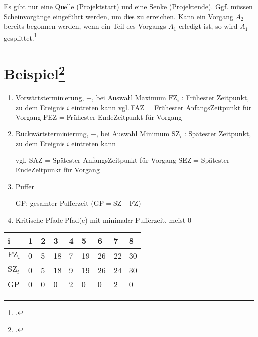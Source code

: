 \documentclass{lehramt-informatik}
\begin{document}
Es gibt nur eine Quelle (Projektstart) und eine Senke (Projektende).
Ggf. müssen Scheinvorgänge eingeführt werden, um dies zu erreichen.
%
Kann ein Vorgang $A_2$ bereits begonnen werden, wenn ein Teil des
Vorgangs $A_1$ erledigt ist, so wird $A_1$ gesplittet.\footcite[Seite
27]{sosy:fs:3}

\section{Beispiel\footcite[Seite 16 - 21]{sosy:fs:3}}

\begin{center}
\end{center}

\begin{enumerate}

%

\item  Vorwärtsterminierung, $+$, bei Auswahl Maximum
$\text{FZ}_i$ : Frühester Zeitpunkt, zu dem Ereignis $i$ eintreten kann
vgl. FAZ = Frühester AnfangsZeitpunkt für Vorgang
FEZ = Frühester EndeZeitpunkt für Vorgang

%

\item Rückwärtsterminierung, $-$, bei Auswahl Minimum
$\text{SZ}_i$ : Spätester Zeitpunkt, zu dem Ereignis $i$ eintreten kann

vgl. SAZ = Spätester AnfangsZeitpunkt für Vorgang
SEZ = Spätester EndeZeitpunkt für Vorgang

%

\item Puffer

GP: gesamter Pufferzeit ($\text{GP} = \text{SZ} - \text{FZ}$)

%

\item Kritische Pfade
Pfad(e) mit minimaler Pufferzeit, meist $0$

\end{enumerate}

\begin{tabular}{|l|l|l|l|l|l|l|l|l|}
\hline
i             & 1 & 2 & 3  & 4 & 5  & 6  & 7  & 8 \\\hline\hline
$\text{FZ}_i$ & 0 & 5 & 18 & 7 & 19 & 26 & 22 & 30 \\\hline
$\text{SZ}_i$ & 0 & 5 & 18 & 9 & 19 & 26 & 24 & 30 \\\hline
GP            & 0 & 0 & 0  & 2 & 0  & 0  & 2  & 0 \\\hline
\end{tabular}
\end{document}
